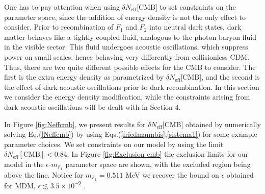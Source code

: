\documentclass[12pt]{article}
\begin{document}
One has to pay attention when using $\delta N _{\text{eff}}$[CMB] to set constraints on the parameter space, since the addition of energy density is not the only effect to consider. Prior to recombination of $F _1$ and $F _2$ into neutral dark states, dark matter behaves like a tightly coupled fluid, analogous to the photon-baryon fluid in the visible sector. This fluid undergoes acoustic oscillations, which suppress power on small scales, hence behaving very differently from collisionless CDM. Thus, there are two quite different possible effects for the CMB to consider. The first is the extra energy density as parametrized by $\delta N _{\text{eff}}$[CMB], and the second is the effect of dark acoustic oscillations prior to dark recombination. In this section we consider the energy density modification, while the constraints arising from dark acoustic oscillations will be dealt with in Section 4.


In Figure \ref{fig:Neffcmb}, we present results for $\delta N _{\text{eff}}$[CMB] obtained by numerically solving Eq.(\ref{Neffcmb}) by using Eqs.(\ref{friedmannbis},\ref{sistema1}) for some example parameter choices. We set constraints on our model by using the limit $\delta N _{\text{eff}}[\text{CMB}] < 0.84$. In Figure \ref{fig:Exclusion cmb} the exclusion limits for our model in the $\epsilon$-$m _{F_1}$ parameter space are shown, with the excluded region being above the line. Notice for $m _{F_1} = 0.511$ MeV we recover the bound on $\epsilon$ obtained for MDM, $\epsilon \lesssim 3.5 \times 10 ^{-9}$ \cite{predictions}.
\end{document}

